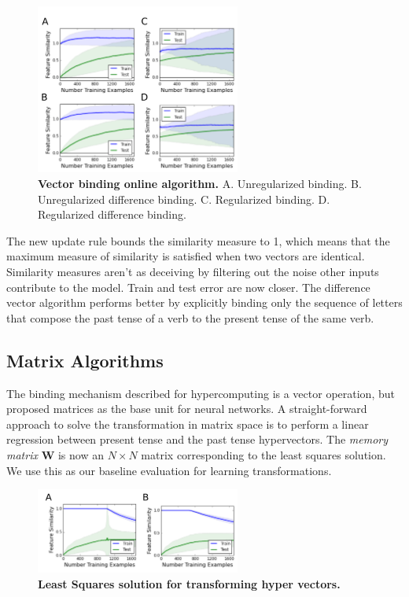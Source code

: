 \documentclass{article}
\begin{document}
\begin{figure}[h]
\centering
\includegraphics[width=0.6\textwidth]{vector_binding_algorithm-170518.png}
\caption{\textbf{Vector binding online algorithm.} A. Unregularized binding. B. Unregularized difference binding. C. Regularized binding. D. Regularized difference binding.}
\end{figure}

The new update rule bounds the similarity measure to 1, which means that the maximum measure of similarity is satisfied when two vectors are identical. Similarity measures aren't as deceiving by filtering out the noise other inputs contribute to the model. Train and test error are now closer. The difference vector algorithm performs better by explicitly binding only the sequence of letters that compose the past tense of a verb to the present tense of the same verb. 

\subsection{Matrix Algorithms}

The binding mechanism described for hypercomputing is a vector operation, but \citet{Rumelhart1986a} proposed matrices as the base unit for neural networks. A straight-forward approach to solve the transformation in matrix space is to perform a linear regression between present tense and the past tense hypervectors. The \emph{memory matrix} $\mathbf{W}$ is now an $N \times N$ matrix corresponding to the least squares solution. We use this as our baseline evaluation for learning transformations.

\begin{figure}
\centering
\includegraphics[width=0.6\textwidth]{regression_issue-170518.png}
\caption{\textbf{Least Squares solution for transforming hyper vectors.}}
\end{figure}
\end{document}
